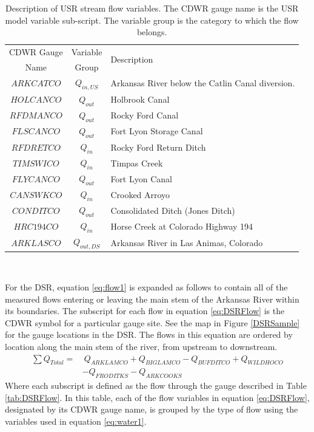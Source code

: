 \begin{linenumbers}
\begin{table}[htbp]
	\centering
	\caption[Description of USR stream flow variables.]{Description of USR stream flow variables.  The CDWR gauge name is the USR model variable sub-script.  The variable group is the category to which the flow belongs.}
	\label{tab:USRFlow}
	\begin{tabular}{c c p{3.5in}}
		\toprule
		CDWR Gauge & Variable & \multirow{2}{*}{Description}\\
		Name				& Group & \\
		\toprule
		$ ARKCATCO $ & $ Q_{in,US} $ & Arkansas River below the Catlin Canal diversion.\\ 
		$ HOLCANCO $ & $ Q_{out} $ & Holbrook Canal \\
		$ RFDMANCO $ & $ Q_{out} $ & Rocky Ford Canal\\
		$ FLSCANCO $ & $ Q_{out} $ & Fort Lyon Storage Canal\\
		$ RFDRETCO $ & $ Q_{in} $ & Rocky Ford Return Ditch\\
		$ TIMSWICO $ & $ Q_{in} $ & Timpas Creek\\
		$ FLYCANCO $ & $ Q_{out} $ & Fort Lyon Canal\\
		$ CANSWKCO $ & $ Q_{in} $ & Crooked Arroyo\\
		$ CONDITCO $ & $ Q_{out} $ & Consolidated Ditch (Jones Ditch)\\
		$ HRC194CO $ & $ Q_{in} $ & Horse Creek at Colorado Highway 194\\
		$ ARKLASCO $ & $ Q_{out,DS} $ & Arkansas River in Las Animas, Colorado\\
		\bottomrule
	\end{tabular}\\
\end{table}

For the DSR, equation \ref{eq:flow1} is expanded as follows to contain all of the measured flows entering or leaving the main stem of the Arkansas River within its boundaries.  The subscript for each flow in equation \ref{eq:DSRFlow} is the CDWR symbol for a particular gauge site.  See the map in Figure \ref{DSRSample} for the gauge locations in the DSR.  The flows in this equation are ordered by location along the main stem of the river, from upstream to downstream.
\begin{align}
	\label{eq:DSRFlow}
	\sum Q_{Total} = &~Q_{ARKLAMCO} + Q_{BIGLAMCO} - Q_{BUFDITCO} + Q_{WILDHOCO} \\
	\nonumber & - Q_{FRODITKS} - Q_{ARKCOOKS}
\end{align}
Where each subscript is defined as the flow through the gauge described in Table \ref{tab:DSRFlow}.  In this table, each of the flow variables in equation \ref{eq:DSRFlow}, designated by its CDWR gauge name, is grouped by the type of flow using the variables used in equation \ref{eq:water1}.\\


\end{linenumbers}
